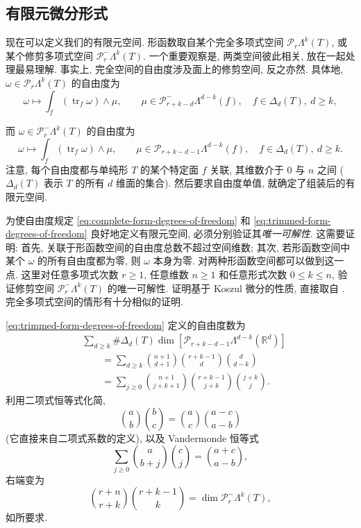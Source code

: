 \subsection{{有限元微分形式}}\label{sec:finite-element-differential-forms}

{现在可以定义我们的有限元空间. 形函数取自某个完全多项式空间 $\mathcal P_r\Lambda^k(T)$, 或某个修剪多项式空间 $\mathcal P_r^-\Lambda^k(T)$. 一个重要观察是, 两类空间彼此相关, 放在一起处理最易理解. 事实上, 完全空间的自由度涉及面上的修剪空间, 反之亦然. 具体地, $\omega\in\mathcal P_r\Lambda^k(T)$ 的自由度为}
\begin{equation}\label{eq:complete-form-degrees-of-freedom}
\omega\mapsto\int_f(\operatorname{tr}_f\omega)\wedge\mu,\qquad\mu\in\mathcal P_{r+k-d}^-\Lambda^{d-k}(f),\quad f\in\Delta_d(T),\ d\geq k,
\end{equation}

{而 $\omega\in\mathcal P_r^-\Lambda^k(T)$ 的自由度为}
\begin{equation}\label{eq:trimmed-form-degrees-of-freedom}
\omega\mapsto\int_f(\operatorname{tr}_f\omega)\wedge\mu,\qquad\mu\in\mathcal P_{r+k-d-1}\Lambda^{d-k}(f),\quad f\in\Delta_d(T),\ d\geq k.
\end{equation}
{注意, 每个自由度都与单纯形 $T$ 的某个特定面 $f$ 关联, 其维数介于 $0$ 与 $n$ 之间 ($\Delta_d(T)$ 表示 $T$ 的所有 $d$ 维面的集合). 然后要求自由度单值, 就确定了组装后的有限元空间.}

{为使自由度规定 \eqref{eq:complete-form-degrees-of-freedom} 和 \eqref{eq:trimmed-form-degrees-of-freedom} 良好地定义有限元空间, 必须分别验证其\emph{唯一可解性}. 这需要证明: 首先, 关联于形函数空间的自由度总数不超过空间维数; 其次, 若形函数空间中某个 $\omega$ 的所有自由度都为零, 则 $\omega$ 本身为零. 对两种形函数空间都可以做到这一点. 这里对任意多项式次数 $r\geq1$, 任意维数 $n\geq1$ 和任意形式次数 $0\leq k\leq n$, 验证修剪空间 $\mathcal P_r^-\Lambda^k(T)$ 的唯一可解性. 证明基于 Koszul 微分的性质, 直接取自 . 完全多项式空间的情形有十分相似的证明.}

{\eqref{eq:trimmed-form-degrees-of-freedom} 定义的自由度数为}
\[
\begin{aligned}
&\sum_{d\geq k}\#\Delta_d(T)\dim[\mathcal P_{r+k-d-1}\Lambda^{d-k}(\mathbb R^d)]\\
&\qquad=\sum_{d\geq k}\binom{n+1}{d+1}\binom{r+k-1}d\binom d{d-k}\\
&\qquad=\sum_{j\geq0}\binom{n+1}{j+k+1}\binom{r+k-1}{j+k}\binom{j+k}j.
\end{aligned}
\]
{利用二项式恒等式化简,}
\[
\binom ab\binom bc=\binom ac\binom{a-c}{a-b}
\]
{(它直接来自二项式系数的定义), 以及 Vandermonde 恒等式}
\[
\sum_{j\geq0}\binom a{b+j}\binom cj=\binom{a+c}{a-b},
\]
{右端变为}
\[
\binom{r+n}{r+k}\binom{r+k-1}k=\dim\mathcal P_r^-\Lambda^k(T),
\]
{如所要求.}


